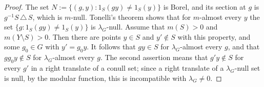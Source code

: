 \documentclass[11pt,letterpaper,reqno]{amsart}
\theoremstyle{definition}
\begin{document}
\begin{itemize}
\begin{proof}
The set $N:=\{(g,y):1_S(gy)\ne1_S(y)\}$ is Borel, and its section at $g$ is $g^{-1}S\,\triangle\,S$, which is $m$-null.
Tonelli's theorem shows that for $m$-almost every $y$ the set $\{g:1_S(gy)\ne1_S(y)\}$ is $\lambda_G$-null.
Assume that $m(S)>0$ and $m(Y\setminus S)>0$.
Then there are points $y\in S$ and $y'\notin S$ with this property, and some $g_0\in G$ with $y'=g_0y$.
It follows that $gy\in S$ for $\lambda_G$-almost every $g$, and that $gg_0y\notin S$ for $\lambda_G$-almost every $g$.
The second assertion means that $g'y\notin S$ for every $g'$ in a right translate of a conull set;
since a right translate of a $\lambda_G$-null set is null, by the modular function, this is incompatible with $\lambda_G\ne0$.
\end{proof}
\end{itemize}
\end{document}
